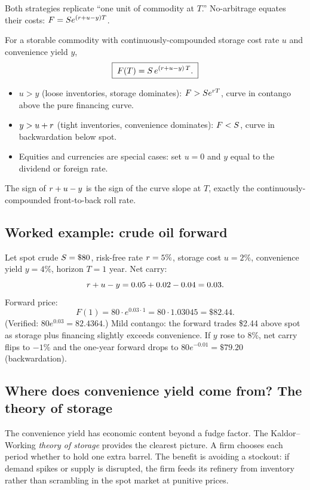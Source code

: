 \medskip
Both strategies replicate ``one unit of commodity at $T$.''
No-arbitrage equates their costs: $F = S e^{(r+u-y)T}$.

\begin{keyfactbox}
For a storable commodity with continuously-compounded storage cost
rate $u$ and convenience yield $y$,
\[
  \boxed{\; F(T) = S\, e^{(r + u - y)\,T}. \;}
\]
\begin{itemize}
  \item $u > y$ (loose inventories, storage dominates):
    $F > S e^{r T}$, curve in contango above the pure
    financing curve.
  \item $y > u + r$ (tight inventories, convenience dominates):
    $F < S$, curve in backwardation below spot.
  \item Equities and currencies are special cases: set $u=0$ and
    $y$ equal to the dividend or foreign rate.
\end{itemize}
The sign of $r + u - y$ is the sign of the curve slope at $T$,
exactly the continuously-compounded front-to-back roll rate.
\end{keyfactbox}

\subsection{Worked example: crude oil forward}

Let spot crude $S = \$80$, risk-free rate $r = 5\%$, storage
cost $u = 2\%$, convenience yield $y = 4\%$, horizon $T = 1$ year.
Net carry:
\[
  r + u - y = 0.05 + 0.02 - 0.04 = 0.03.
\]
Forward price:
\[
  F(1) = 80 \cdot e^{0.03 \cdot 1} = 80 \cdot 1.03045 = \$82.44.
\]
(Verified: $80 e^{0.03} = 82.4364$.) Mild contango: the forward
trades \$2.44 above spot as storage plus financing slightly exceeds
convenience.  If $y$ rose to $8\%$, net carry flips to $-1\%$ and
the one-year forward drops to $80 e^{-0.01} = \$79.20$
(backwardation).

\subsection{Where does convenience yield come from? The theory of storage}
\label{subsec:theory_of_storage}

The convenience yield has economic content beyond a fudge factor.
The Kaldor--Working \emph{theory of storage} provides the clearest
picture.  A firm chooses each period whether to hold one extra
barrel.  The benefit is avoiding a stockout: if demand spikes or
supply is disrupted, the firm feeds its refinery from inventory
rather than scrambling in the spot market at punitive prices.

